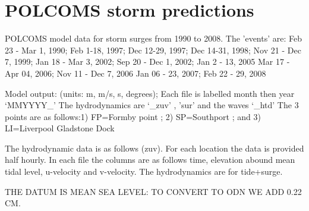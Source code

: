 \documentclass[9]{report}
\begin{document}
\section{ POLCOMS storm predictions }
\begin{description}
  \setlength{\itemsep}{4pt}
  \setlength{\parskip}{2pt}
  \setlength{\parsep}{2pt}
  \item[Abstract]  POLCOMS model data for storm surges from 1990 to 2008.
The 'events' are: Feb 23 - Mar 1, 1990; Feb 1-18, 1997; Dec 12-29, 1997; Dec 14-31, 1998; Nov 21 - Dec 7, 1999; Jan 18 - Mar 3, 2002;
Sep 20 - Dec 1, 2002; Jan 2 - 13, 2005
Mar 17 - Apr 04, 2006; Nov 11 - Dec 7, 2006
Jan 06 - 23, 2007; Feb 22 - 29, 2008


Model output: (units: m, m/s, s, degrees); 
Each file is labelled month then year `MMYYYY\_'
The hydrodynamics are `\_zuv' , 'sur' and the waves `\_htd'
The 3 points are as follows:1) FP=Formby point ; 2) SP=Southport ; and 3) LI=Liverpool Gladstone Dock 
   
The hydrodynamic data is as follows (zuv). For each location the data is provided half hourly. 
In each file the columns are as follows time, elevation abound mean tidal level, u-velocity and v-velocity.  
The hydrodynamics are for tide+surge. 

THE DATUM IS MEAN SEA LEVEL: TO CONVERT TO ODN WE ADD 0.22 CM.




\end{description}
\end{document}
